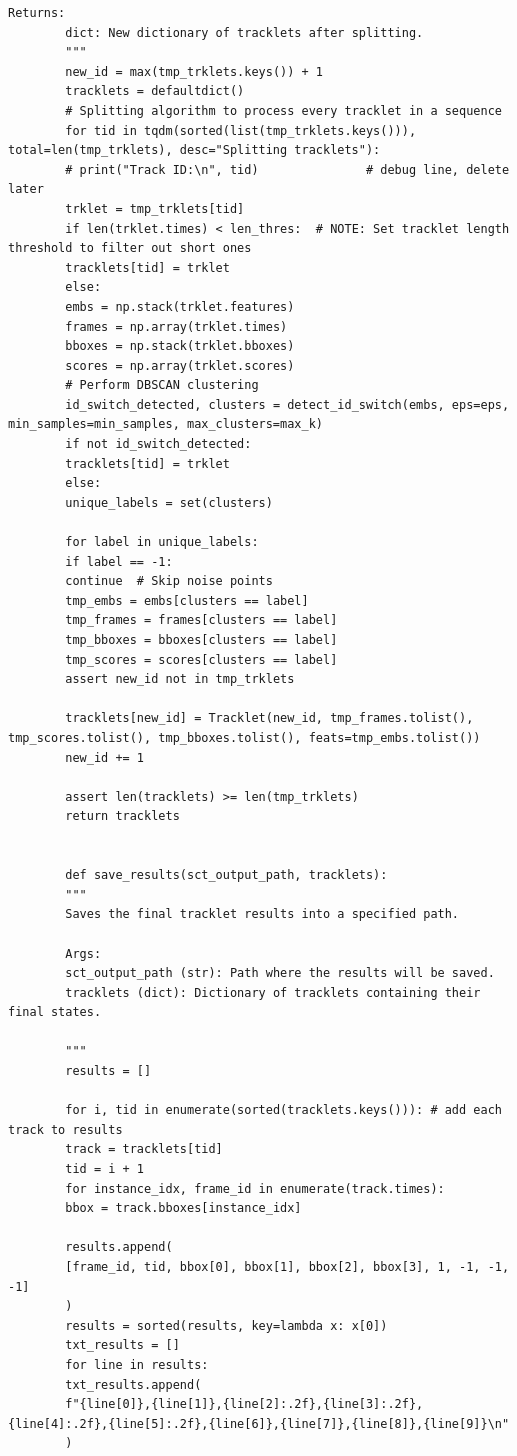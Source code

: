 \documentclass[12pt, a4paper, twoside]{article}
\begin{document}
\begin{lstlisting}[style=pythonstyle]
		Returns:
		dict: New dictionary of tracklets after splitting.
		"""
		new_id = max(tmp_trklets.keys()) + 1
		tracklets = defaultdict()
		# Splitting algorithm to process every tracklet in a sequence
		for tid in tqdm(sorted(list(tmp_trklets.keys())), total=len(tmp_trklets), desc="Splitting tracklets"):
		# print("Track ID:\n", tid)               # debug line, delete later
		trklet = tmp_trklets[tid]
		if len(trklet.times) < len_thres:  # NOTE: Set tracklet length threshold to filter out short ones
		tracklets[tid] = trklet
		else:
		embs = np.stack(trklet.features)
		frames = np.array(trklet.times)
		bboxes = np.stack(trklet.bboxes)
		scores = np.array(trklet.scores)
		# Perform DBSCAN clustering
		id_switch_detected, clusters = detect_id_switch(embs, eps=eps, min_samples=min_samples, max_clusters=max_k)
		if not id_switch_detected:
		tracklets[tid] = trklet
		else:
		unique_labels = set(clusters)
		
		for label in unique_labels:
		if label == -1:
		continue  # Skip noise points
		tmp_embs = embs[clusters == label]
		tmp_frames = frames[clusters == label]
		tmp_bboxes = bboxes[clusters == label]
		tmp_scores = scores[clusters == label]
		assert new_id not in tmp_trklets
		
		tracklets[new_id] = Tracklet(new_id, tmp_frames.tolist(), tmp_scores.tolist(), tmp_bboxes.tolist(), feats=tmp_embs.tolist())
		new_id += 1
		
		assert len(tracklets) >= len(tmp_trklets)
		return tracklets
		
		
		def save_results(sct_output_path, tracklets):
		"""
		Saves the final tracklet results into a specified path.
		
		Args:
		sct_output_path (str): Path where the results will be saved.
		tracklets (dict): Dictionary of tracklets containing their final states.
		
		"""
		results = []
		
		for i, tid in enumerate(sorted(tracklets.keys())): # add each track to results
		track = tracklets[tid]
		tid = i + 1
		for instance_idx, frame_id in enumerate(track.times):
		bbox = track.bboxes[instance_idx]
		
		results.append(
		[frame_id, tid, bbox[0], bbox[1], bbox[2], bbox[3], 1, -1, -1, -1]
		)
		results = sorted(results, key=lambda x: x[0])
		txt_results = []
		for line in results:
		txt_results.append(
		f"{line[0]},{line[1]},{line[2]:.2f},{line[3]:.2f},{line[4]:.2f},{line[5]:.2f},{line[6]},{line[7]},{line[8]},{line[9]}\n"
		)
		

\end{lstlisting}
\end{document}
